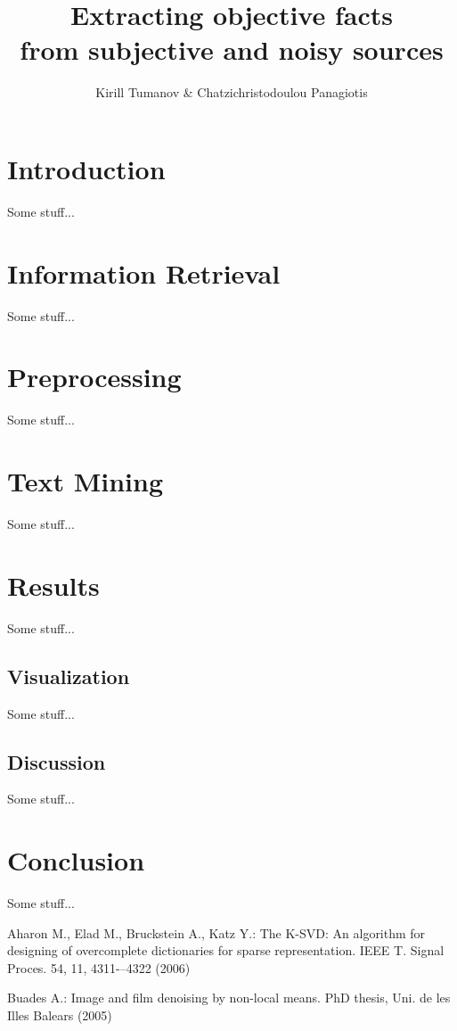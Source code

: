\documentclass[]{article}
\title{Extracting objective facts \\ from subjective and noisy sources}
\author{Kirill Tumanov \& Chatzichristodoulou Panagiotis}
\begin{document}
\maketitle

\begin{abstract}

\end{abstract}

%
\section{Introduction}
%
Some stuff...
%
\section{Information Retrieval}
%
Some stuff...
%
\section{Preprocessing}
%
Some stuff...
%
\section{Text Mining}
%
Some stuff...
%
\section{Results}
%
Some stuff...
% 
\subsection{Visualization}
%
Some stuff...
% 
\subsection{Discussion}
%
Some stuff...
%
\section{Conclusion}
%
Some stuff...
%
%
\begin{thebibliography}{99}
%


Aharon M., Elad M., Bruckstein A., Katz Y.:
The K-SVD: An algorithm for designing of overcomplete dictionaries for sparse representation.
IEEE T. Signal Proces. 54, 11, 4311-–4322 (2006)

Buades A.:
Image and film denoising by non-local means.
PhD thesis, Uni. de les Illes Balears (2005)

\end{thebibliography}
\end{document}
